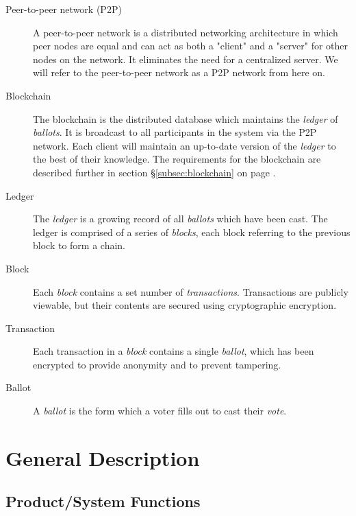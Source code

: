 \documentclass[a4paper,12pt]{article}
\begin{document}
\begin{description}

    \item[Peer-to-peer network (P2P)]
        A peer-to-peer network is a distributed networking architecture in which peer nodes are equal and can act as both a "client" and a "server" for other nodes on the network. It eliminates the need for a centralized server. We will refer to the peer-to-peer network as a P2P network from here on.

	\item[Blockchain]
		The blockchain is the distributed database which maintains the \textit{ledger} of \textit{ballots}. It is broadcast to all participants in the system via the P2P network. Each client will maintain an up-to-date version of the \textit{ledger} to the best of their knowledge. The requirements for the blockchain are described further in section \S\ref{subsec:blockchain} on page \pageref{subsec:blockchain}.

	\item[Ledger]
		The \textit{ledger} is a growing record of all \textit{ballots} which have been cast. The ledger is comprised of a series of \textit{blocks}, each block referring to the previous block to form a chain.

    \item[Block]
        Each \textit{block} contains a set number of \textit{transactions}. Transactions are publicly viewable, but their contents are secured using cryptographic encryption.

	\item[Transaction]
		Each transaction in a \textit{block} contains a single \textit{ballot}, which has been encrypted to provide anonymity and to prevent tampering.

    \item[Ballot]
        A \textit{ballot} is the form which a voter fills out to cast their \textit{vote}.

\end{description}

\section{General Description}
\subsection{Product/System Functions}
\end{document}
